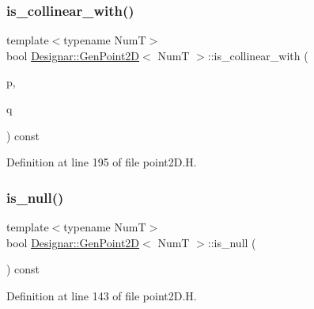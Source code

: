 \mbox{\label{class_designar_1_1_gen_point2_d_a5ffe32dc4a322ba54d2bcc0d4b2a04e6}} 
\subsubsection{\texorpdfstring{is\+\_\+collinear\+\_\+with()}{is\_collinear\_with()}}
{\footnotesize\ttfamily template$<$typename NumT$>$ \\
bool \hyperlink{class_designar_1_1_gen_point2_d}{Designar\+::\+Gen\+Point2D}$<$ NumT $>$\+::is\+\_\+collinear\+\_\+with (\begin{DoxyParamCaption}\item[{const \hyperlink{class_designar_1_1_gen_point2_d}{Gen\+Point2D}$<$ NumT $>$ \&}]{p,  }\item[{const \hyperlink{class_designar_1_1_gen_point2_d}{Gen\+Point2D}$<$ NumT $>$ \&}]{q }\end{DoxyParamCaption}) const\hspace{0.3cm}{\ttfamily [inline]}}



Definition at line 195 of file point2\+D.\+H.

\mbox{\label{class_designar_1_1_gen_point2_d_aa6c5b4c078b46565646f1bd93dae5bf4}} 
\subsubsection{\texorpdfstring{is\+\_\+null()}{is\_null()}}
{\footnotesize\ttfamily template$<$typename NumT$>$ \\
bool \hyperlink{class_designar_1_1_gen_point2_d}{Designar\+::\+Gen\+Point2D}$<$ NumT $>$\+::is\+\_\+null (\begin{DoxyParamCaption}{ }\end{DoxyParamCaption}) const\hspace{0.3cm}{\ttfamily [inline]}}



Definition at line 143 of file point2\+D.\+H.

